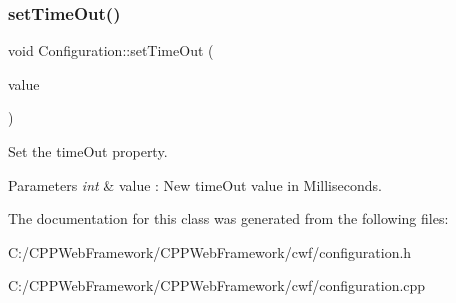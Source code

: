 \subsubsection{\texorpdfstring{set\+Time\+Out()}{setTimeOut()}}
{\footnotesize\ttfamily void Configuration\+::set\+Time\+Out (\begin{DoxyParamCaption}\item[{int}]{value }\end{DoxyParamCaption})}



Set the time\+Out property. 


\begin{DoxyParams}{Parameters}
{\em int} & value \+: New time\+Out value in Milliseconds. \\
\hline
\end{DoxyParams}


The documentation for this class was generated from the following files\+:\begin{DoxyCompactItemize}
\item 
C\+:/\+C\+P\+P\+Web\+Framework/\+C\+P\+P\+Web\+Framework/cwf/configuration.\+h\item 
C\+:/\+C\+P\+P\+Web\+Framework/\+C\+P\+P\+Web\+Framework/cwf/configuration.\+cpp\end{DoxyCompactItemize}
